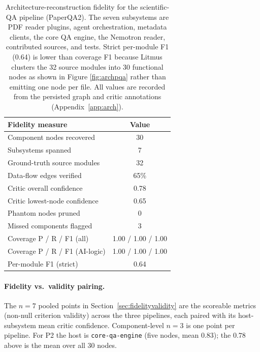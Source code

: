 \documentclass[11pt]{article}
\begin{document}
\begin{table}[t]
\centering
\small
\begin{tabular}{lc}
\toprule
\textbf{Fidelity measure} & \textbf{Value} \\
\midrule
Component nodes recovered            & 30 \\
Subsystems spanned                   & 7 \\
Ground-truth source modules          & 32 \\
Data-flow edges verified             & 65\% \\
Critic overall confidence            & 0.78 \\
Critic lowest-node confidence        & 0.65 \\
Phantom nodes pruned                 & 0 \\
Missed components flagged            & 3 \\
Coverage P / R / F1 (all)            & 1.00 / 1.00 / 1.00 \\
Coverage P / R / F1 (AI-logic)       & 1.00 / 1.00 / 1.00 \\
Per-module F1 (strict)               & 0.64 \\
\bottomrule
\end{tabular}
\caption{Architecture-reconstruction fidelity for the scientific-QA pipeline (PaperQA2). The seven subsystems are PDF reader plugins, agent orchestration, metadata clients, the core QA engine, the Nemotron reader, contributed sources, and tests. Strict per-module F1 (0.64) is lower than coverage F1 because Litmus clusters the 32 source modules into 30 functional nodes as shown in Figure \ref{fig:archpqa} rather than emitting one node per file. All values are recorded from the persisted graph and critic annotations (Appendix~\ref{app:arch}).}
\label{tab:archfidelity-pqa}
\end{table}

\paragraph{Fidelity vs.\ validity pairing.}
The $n{=}7$ pooled points in Section~\ref{sec:fidelityvalidity} are the scoreable metrics (non-null criterion validity) across the three pipelines, each paired with its host-subsystem mean critic confidence. Component-level $n{=}3$ is one point per pipeline. For P2 the host is \texttt{core-qa-engine} (five nodes, mean $0.83$); the $0.78$ above is the mean over all 30 nodes.
\end{document}
